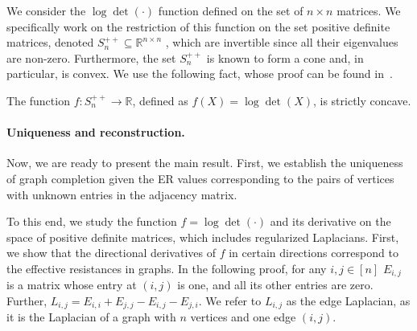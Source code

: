 {We consider the $\log\det(\cdot)$ function defined on the set of $n\times n$ matrices.  We specifically work on the restriction of this function on the set positive definite matrices, denoted $S_n^{++} \subseteq \mathbb{R}^{n \times n}$ %
, which are invertible since all their eigenvalues are non-zero. Furthermore, the set $S_n^{++}$ is known to form a cone and, in particular, is convex. 
We use the following fact, whose proof can be found in~\citet[Section 3.5.1]{book/boyd-convex-opt}.
\begin{lemma}
    \label{lem:log-det-concave}
    The function $f : S_n^{++} \to \mathbb{R}$, defined as $f(X) = \log\det (X)$, 
    is strictly concave.
\end{lemma}
}


\paragraph{Uniqueness and reconstruction.}  
Now, we are ready to present the main result. First, we establish the uniqueness of graph completion given the ER values corresponding to the pairs of vertices with unknown entries in the adjacency matrix. %

To this end, we study the function $f = \log\det(\cdot)$ and its derivative on the space of positive definite matrices, which includes regularized Laplacians. First, we show that the directional derivatives of $f$ in certain directions correspond to the effective resistances in graphs.  In the following proof, for any $i,j\in [n]$ $E_{i,j}$ is a matrix whose entry at $(i,j)$ is one, and all its other entries are zero.  Further, $L_{i,j} = E_{i,i}+E_{j,j}-E_{i,j}-E_{j,i}$.  We refer to $L_{i,j}$ as the edge Laplacian, as it is the Laplacian of a graph with $n$ vertices and one edge $(i,j)$.

